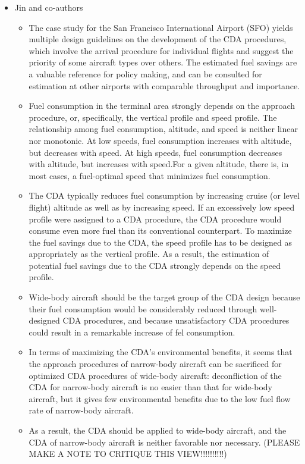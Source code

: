 \documentclass{aer1315-pretty}
\begin{document}
\begin{itemize}
\item Jin and co-authors \cite{Jin:2013} 
\begin{itemize}
\item The case study for the San Francisco International Airport (SFO) yields multiple design guidelines on the development of the CDA procedures, which involve the arrival procedure for individual flights and suggest the priority of some aircraft types over others. The estimated fuel savings are a valuable reference for policy making, and can be consulted for estimation at other airports with comparable throughput and importance.
\item Fuel consumption in the terminal area strongly depends on the approach procedure, or, specifically, the vertical profile and speed profile. The relationship among fuel consumption, altitude, and speed is neither linear nor monotonic. At low speeds, fuel consumption increases with altitude, but decreases with speed. At high speeds,
fuel consumption decreases with altitude, but increases with speed.For a given altitude, there is, in most cases, a fuel-optimal speed that minimizes fuel consumption.
\item The CDA typically reduces fuel consumption by increasing cruise (or level flight) altitude as well as by increasing speed. If an excessively low speed profile were
assigned to a CDA procedure, the CDA procedure would consume even more fuel than its conventional counterpart. To maximize the fuel savings due to the CDA, the speed profile has to be designed as appropriately as the vertical profile. As a result, the estimation of potential fuel savings due to the CDA strongly depends on the speed
profile. 
\item Wide-body aircraft should be the target group of the CDA design because their fuel consumption would be considerably reduced through well-designed CDA procedures, and because unsatisfactory CDA procedures could result in a remarkable increase of fel consumption. 
\item In terms of maximizing the CDA’s environmental benefits, it seems that the approach procedures of narrow-body aircraft can be sacrificed for optimized CDA procedures of wide-body aircraft: deconfliction of the CDA for narrow-body aircraft is no easier than that for wide-body aircraft, but it gives few environmental benefits due to the low fuel flow rate of narrow-body aircraft. 
\item As a result, the CDA should be applied to wide-body aircraft, and the CDA of narrow-body aircraft is neither favorable nor necessary. (PLEASE MAKE A NOTE TO CRITIQUE THIS VIEW!!!!!!!!!!)
\end{itemize}




\end{itemize}
\end{document}
